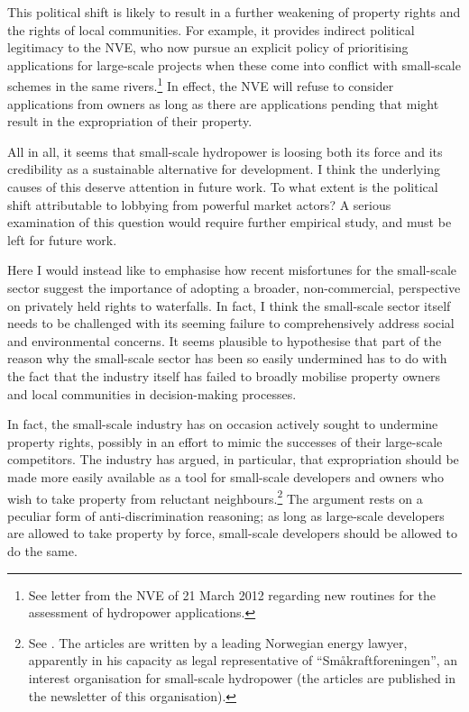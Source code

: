 This political shift is likely to result in a further weakening of property rights and the rights of local communities. For example, it provides indirect political legitimacy to the NVE, who now pursue an explicit policy of prioritising applications for large-scale projects when these come into conflict with small-scale schemes in the same rivers.\footnote{See letter from the NVE of 21 March 2012 regarding new routines for the assessment of hydropower applications.} In effect, the NVE will refuse to consider applications from owners as long as there are applications pending that might result in the expropriation of their property.

All in all, it seems that small-scale hydropower is loosing both its force and its credibility as a sustainable alternative for development. I think the underlying causes of this deserve attention in future work. To what extent is the political shift attributable to lobbying from powerful market actors? A serious examination of this question would require further empirical study, and must be left for future work.

Here I would instead like to emphasise how recent misfortunes for the small-scale sector suggest the importance of adopting a broader, non-commercial, perspective on privately held rights to waterfalls. In fact, I think the small-scale sector itself needs to be challenged with its seeming failure to comprehensively address social and environmental concerns. It seems plausible to hypothesise that part of the reason why the small-scale sector has been so easily undermined has to do with the fact that the industry itself has failed to broadly mobilise property owners and local communities in decision-making processes.

In fact, the small-scale industry has on occasion actively sought to undermine property rights, possibly in an effort to mimic the successes of their large-scale competitors. The industry has argued, in particular, that expropriation should be made more easily available as a tool for small-scale developers and owners who wish to take property from reluctant neighbours.\footnote{See \cite{brekken07,brekken08}. The articles are written by a leading Norwegian energy lawyer, apparently in his capacity as legal representative of ``Småkraftforeningen'', an interest organisation for small-scale hydropower (the articles are published in the newsletter of this organisation).} The argument rests on a peculiar form of anti-discrimination reasoning; as long as large-scale developers are allowed to take property by force, small-scale developers should be allowed to do the same. 

